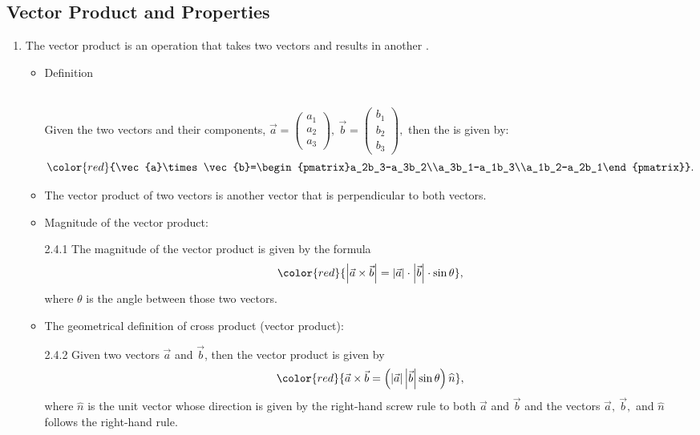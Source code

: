 \documentclass[12pt, a4paper]{article}
\begin{document}
\subsection{Vector Product and Properties}
\begin{enumerate}
  \item The vector product is an operation that takes two vectors and results in another {\color{red}{vector}}. 
  \begin{itemize}
    \item Definition
    \begin{myclaim}{ }{}
    \\Given the two vectors and their components, $\vec{a}=\begin{pmatrix}a_1\\a_2\\a_3\end{pmatrix},\ \vec{b}=\begin{pmatrix}b_1\\b_2\\b_3\end{pmatrix},$ then the \textbf{\color{red}{vector product}} is given by: 
    $${\color{red}{\vec{a}\times\vec{b}=\begin{pmatrix}a_2b_3-a_3b_2\\a_3b_1-a_1b_3\\a_1b_2-a_2b_1\end{pmatrix}}}.$$
    \end{myclaim}
    \item The vector product of two vectors is another vector that is perpendicular to both vectors. 
    \item Magnitude of the vector product: 
    \begin{theorem}{2.4.1}{}
      The magnitude of the vector product is given by the formula $${\color{red}{\left|\vec{a}\times\vec{b}\right|=\left|\vec{a}\right|\cdot\left|\vec{b}\right|\cdot\sin\theta}},$$
      where $\theta$ is the angle between those two vectors. 
      {}
    \end{theorem} 
    \item The geometrical definition of cross product (vector product): 
    \begin{theorem}{2.4.2}{}
      Given two vectors $\vec{a}$ and $\vec{b}$, then the vector product is given by $${\color{red}{\vec{a}\times\vec{b}=\left(\left|\vec{a}\right|\left|\vec{b}\right|\sin\theta\right)\widehat{n}}},$$
      where $\widehat{n}$ is the unit vector whose direction is given by the right-hand screw rule to both $\vec{a}$ and $\vec{b}$ and the vectors $\vec{a},\ \vec{b},$ and $\widehat{n}$ follows the right-hand rule. 

\end{theorem}
\end{itemize}
\end{enumerate}
\end{document}
